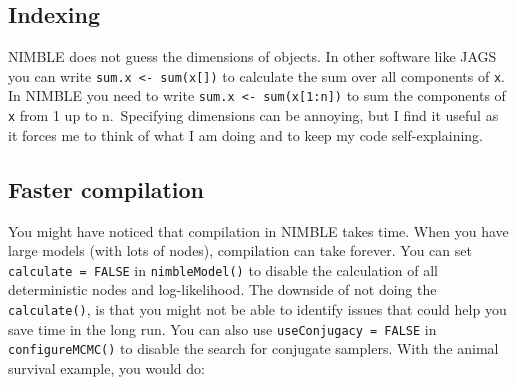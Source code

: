 \documentclass[
  12pt,
]{krantz}
\begin{document}
\subsection{Indexing}\label{indexing}

NIMBLE does not guess the dimensions of objects. In other software like JAGS you can write \texttt{sum.x\ \textless{}-\ sum(x{[}{]})} to calculate the sum over all components of \texttt{x}. In NIMBLE you need to write \texttt{sum.x\ \textless{}-\ sum(x{[}1:n{]})} to sum the components of \texttt{x} from 1 up to n.~Specifying dimensions can be annoying, but I find it useful as it forces me to think of what I am doing and to keep my code self-explaining.

\subsection{Faster compilation}\label{faster-compilation}

You might have noticed that compilation in NIMBLE takes time. When you have large models (with lots of nodes), compilation can take forever. You can set \texttt{calculate\ =\ FALSE} in \texttt{nimbleModel()} to disable the calculation of all deterministic nodes and log-likelihood. The downside of not doing the \texttt{calculate()}, is that you might not be able to identify issues that could help you save time in the long run. You can also use \texttt{useConjugacy\ =\ FALSE} in \texttt{configureMCMC()} to disable the search for conjugate samplers. With the animal survival example, you would do:
\end{document}
